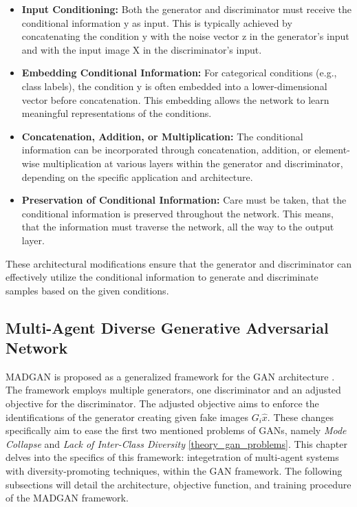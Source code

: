 \begin{itemize}
    \item \textbf{Input Conditioning:} Both the generator and discriminator must receive the conditional information y as input. This is typically achieved by concatenating the condition y with the noise vector z in the generator's input and with the input image X in the discriminator's input.
    \item \textbf{Embedding Conditional Information:} For categorical conditions (e.g., class labels), the condition y is often embedded into a lower-dimensional vector before concatenation. This embedding allows the network to learn meaningful representations of the conditions.
    \item \textbf{Concatenation, Addition, or Multiplication:} The conditional information can be incorporated through concatenation, addition, or element-wise multiplication at various layers within the generator and discriminator, depending on the specific application and architecture.
    \item \textbf{Preservation of Conditional Information:} Care must be taken, that the conditional information is preserved throughout the network. This means, that the information must traverse the network, all the way to the output layer.
\end{itemize}

These architectural modifications ensure that the generator and discriminator can effectively utilize the conditional information to generate and discriminate samples based on the given conditions.

\subsection[Multi-Agent Diverse Generative Adversarial Network - MADGAN]{Multi-Agent Diverse Generative Adversarial Network}
\label{theoretical_madgan}
MADGAN is proposed as a generalized framework for the GAN architecture \cite{ghosh2018madgan}. The framework employs multiple generators, one discriminator and an adjusted objective for the discriminator. The adjusted objective aims to enforce the identifications of the generator creating given fake images \(G_{i} \hat{x}\). These changes specifically aim to ease the first two mentioned problems of GANs, namely \textit{Mode Collapse} and \textit{Lack of Inter-Class Diversity} \ref{theory_gan_problems}. This chapter delves into the specifics of this framework: integetration of multi-agent systems with diversity-promoting techniques, within the GAN framework. The following subsections will detail the architecture, objective function, and training procedure of the MADGAN framework.

